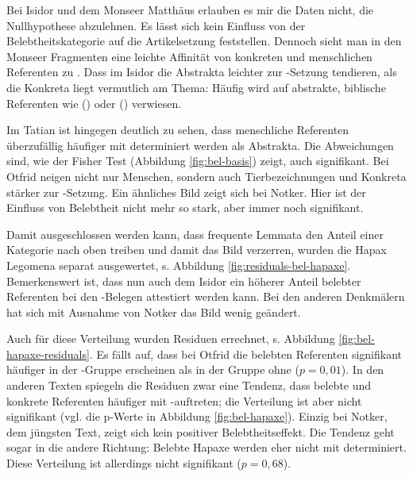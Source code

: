Bei Isidor und dem Monseer Matthäus erlauben es mir die Daten nicht, die Nullhypothese abzulehnen. Es lässt sich kein Einfluss von der Belebtheitskategorie auf die Artikelsetzung feststellen. Dennoch sieht man in den Monseer Fragmenten eine leichte Affinität von konkreten und menschlichen Referenten zu . Dass im Isidor die Abstrakta leichter zur -Setzung tendieren, als die Konkreta liegt vermutlich am Thema: Häufig wird auf abstrakte, biblische Referenten wie  () oder   () verwiesen.
 
Im Tatian ist hingegen deutlich zu sehen, dass menschliche Referenten überzufällig häufiger mit  determiniert werden als Abstrakta. Die Abweichungen sind, wie der Fisher Test (Abbildung \ref{fig:bel-basis}) zeigt, auch signifikant. Bei Otfrid neigen nicht nur Menschen, sondern auch  Tierbezeichnungen und Konkreta stärker zur -Setzung. Ein ähnliches Bild zeigt sich bei Notker. Hier ist der Einfluss von Belebtheit nicht mehr so stark, aber immer noch signifikant.    

Damit ausgeschlossen werden kann, dass frequente Lemmata den Anteil einer Kategorie nach oben treiben und damit das Bild verzerren, wurden die Hapax Legomena separat ausgewertet, s. Abbildung \ref{fig:residuals-bel-hapaxe}. Bemerkenswert ist, dass nun auch dem Isidor ein höherer Anteil belebter Referenten bei den -Belegen attestiert werden kann. Bei den anderen Denkmälern hat sich mit Ausnahme von Notker das Bild wenig geändert. 

Auch für diese Verteilung wurden Residuen errechnet, s. Abbildung  \ref{fig:bel-hapaxe-residuals}. Es fällt auf, dass bei Otfrid die belebten Referenten signifikant häufiger in der -Gruppe erscheinen als in der Gruppe ohne  ($p = 0,01$). In den anderen Texten spiegeln die Residuen zwar eine Tendenz, dass belebte und konkrete Referenten häufiger mit -auftreten; die Verteilung ist aber nicht signifikant (vgl. die p-Werte in Abbildung \ref{fig:bel-hapaxe}). Einzig bei Notker, dem jüngsten Text, zeigt sich kein positiver Belebtheitseffekt. Die Tendenz geht sogar in die andere Richtung: Belebte Hapaxe werden eher nicht mit  determiniert. Diese Verteilung ist allerdings nicht signifikant ($p = 0,68$).  


